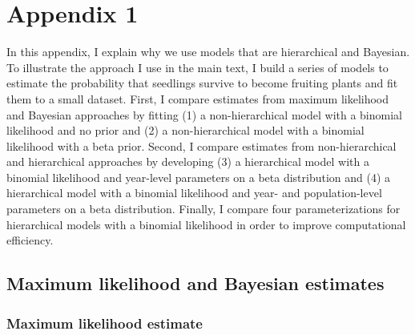 \documentclass[12pt, oneside, titlepage]{article}   	%
\begin{document}
 

\section*{Appendix 1}


In this appendix, I explain why we use models that are hierarchical and Bayesian. To illustrate the approach I use in the main text, I build a series of models to estimate the probability that seedlings survive to become fruiting plants and fit them to a small dataset. First, I compare estimates from maximum likelihood and Bayesian approaches by fitting (1) a non-hierarchical model with a binomial likelihood and no prior and (2) a non-hierarchical model with a binomial likelihood with a beta prior. Second, I compare estimates from non-hierarchical and hierarchical approaches by developing (3) a hierarchical model with a binomial likelihood and year-level parameters on a beta distribution and (4) a hierarchical model with a binomial likelihood and year- and population-level parameters on a beta distribution. Finally, I compare four parameterizations for hierarchical models with a binomial likelihood in order to improve computational efficiency. 

\subsection*{Maximum likelihood and Bayesian estimates}
\subsubsection*{Maximum likelihood estimate}
\end{document}
